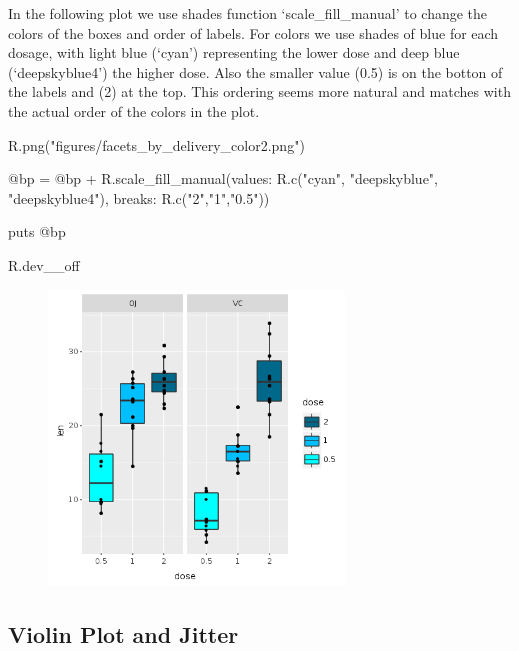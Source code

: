 \documentclass[11pt,]{article}
\newenvironment{Shaded}{\begin{snugshade}}{\end{snugshade}}
\newcommand{\StringTok}[1]{\textcolor[rgb]{0.31,0.60,0.02}{#1}}
\newcommand{\OtherTok}[1]{\textcolor[rgb]{0.56,0.35,0.01}{#1}}
\newcommand{\NormalTok}[1]{#1}
\begin{document}
In the following plot we use shades function `scale\_fill\_manual' to
change the colors of the boxes and order of labels. For colors we use
shades of blue for each dosage, with light blue (`cyan') representing
the lower dose and deep blue (`deepskyblue4') the higher dose. Also the
smaller value (0.5) is on the botton of the labels and (2) at the top.
This ordering seems more natural and matches with the actual order of
the colors in the plot.

\begin{Shaded}
\begin{Highlighting}[]
\NormalTok{R.png(}\StringTok{"figures/facets_by_delivery_color2.png"}\NormalTok{)}

\OtherTok{@bp}\NormalTok{ = }\OtherTok{@bp}\NormalTok{ +}
\NormalTok{      R.scale_fill_manual(}\StringTok{values: }\NormalTok{R.c(}\StringTok{"cyan"}\NormalTok{, }\StringTok{"deepskyblue"}\NormalTok{, }\StringTok{"deepskyblue4"}\NormalTok{),}
                          \StringTok{breaks: }\NormalTok{R.c(}\StringTok{"2"}\NormalTok{,}\StringTok{"1"}\NormalTok{,}\StringTok{"0.5"}\NormalTok{))}

\NormalTok{puts }\OtherTok{@bp}

\NormalTok{R.dev__off}
\end{Highlighting}
\end{Shaded}

\begin{figure}
\centering
\includegraphics[width=0.70000\textwidth]{figures/facets_by_delivery_color2.png}
\caption{}
\end{figure}

\subsection{Violin Plot and Jitter}\label{violin-plot-and-jitter}
\end{document}
